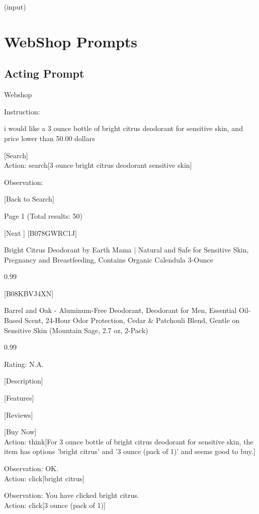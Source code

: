 \documentclass{article} \usepackage{iclr2024_conference,times}
\def\1{\bm{1}}
\begin{document}
(input)

\section{WebShop Prompts}
\label{sec:webshop_prompt}
\subsection{Acting Prompt}

Webshop 

Instruction:  

i would like a 3 ounce bottle of bright citrus deodorant for sensitive skin, and price lower than 50.00 dollars 

[Search]  
\\

Action: search[3 ounce bright citrus deodorant sensitive skin]

Observation: 

[Back to Search] 

Page 1 (Total results: 50) 

[Next
] 
[B078GWRC1J] 

Bright Citrus Deodorant by Earth Mama | Natural and Safe for Sensitive Skin, Pregnancy and Breastfeeding, Contains Organic Calendula 3-Ounce 

\10.99 

[B08KBVJ4XN] 

Barrel and Oak - Aluminum-Free Deodorant, Deodorant for Men, Essential Oil-Based Scent, 24-Hour Odor Protection, Cedar \& Patchouli Blend, Gentle on Sensitive Skin (Mountain Sage, 2.7 oz, 2-Pack) 

\10.99 

Rating: N.A. 

[Description] 

[Features] 

[Reviews] 

[Buy Now]  
\\

Action: think[For 3 ounce bottle of bright citrus deodorant for sensitive skin, the item has options 'bright citrus' and '3 ounce (pack of 1)' and seems good to buy.]

Observation: OK.
\\

Action: click[bright citrus]

Observation: You have clicked bright citrus. 
\\

Action: click[3 ounce (pack of 1)]
\end{document}
